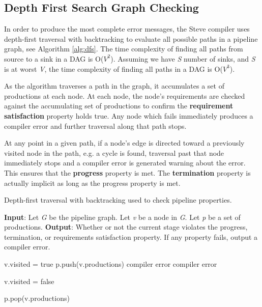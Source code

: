 \subsection{Depth First Search Graph Checking} \label{dfs_desc}

In order to produce the most complete error messages, the Steve compiler uses depth-first traversal with backtracking to evaluate all possible paths in a pipeline graph, see Algorithm \ref{alg:dfs}. The time complexity of finding all paths from source to a sink in a DAG is O($V^2$). Assuming we have \textit{S} number of sinks, and \textit{S} is at worst \textit{V}, the time complexity of finding all paths in a DAG is O($V^3$).

As the algorithm traverses a path in the graph, it accumulates a set of productions at each node. At each node, the node's requirements are checked against the accumulating set of productions to confirm the \textbf{requirement satisfaction} property holds true. Any node which fails immediately produces a compiler error and further traversal along that path stops.

At any point in a given path, if a node's edge is directed toward a previously visited node in the path, e.g. a cycle is found, traversal past that node immediately stops and a compiler error is generated warning about the error. This ensures that the \textbf{progress} property is met. The \textbf{termination} property is actually implicit as long as the progress property is met. 

\begin{algorithm}
 \caption{Depth-first traversal with backtracking used to check pipeline properties.}
 \label{alg:dfs}
 \begin{algorithmic}
 \State
 \State \textbf{Input}: Let \textit{G} be the pipeline graph. Let \textit{v} be a node in \textit{G}. Let \textit{p} be a set of productions.
 \State \textbf{Output}: Whether or not the current stage violates the progress, termination, or requirements satisfaction property. If any property fails, output a compiler error.
 \State 
 
 	\State v.visited = true
 	\State p.push(v.productions)
 				\State {}
 			\Else
 				\State \Return compiler error
 			\EndIf
 		\EndFor
	\Else 	
 		\State \Return compiler error
 	\EndIf
 	
 	\State v.visited = false 
 	
 	\State p.pop(v.productions) 
 \EndFunction
 \end{algorithmic}
 
\end{algorithm}


